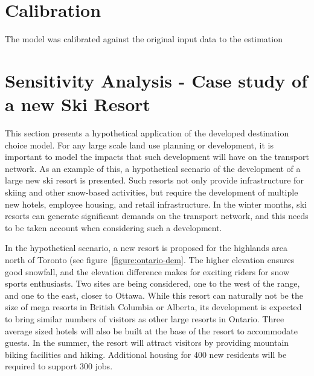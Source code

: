 \section{Calibration}


The model was calibrated against the original input data to the estimation


\section{Sensitivity Analysis - Case study of a new Ski Resort}


This section presents a hypothetical application of the developed destination choice model. For any large scale land use planning or development, it is important to model the impacts that such development will have on the transport network. As an example of this, a hypothetical scenario of the development of a large new ski resort is presented. Such resorts not only provide infrastructure for skiing and other snow-based activities, but require the development of multiple new hotels, employee housing, and retail infrastructure. In the winter months, ski resorts can generate significant demands on the transport network, and this needs to be taken account when considering such a development.

In the hypothetical scenario, a new resort is proposed for the highlands area north of Toronto (see figure~\ref{figure:ontario-dem}. The higher elevation ensures good snowfall, and the elevation difference makes for exciting riders for snow sports enthusiasts. Two sites are being considered, one to the west of the range, and one to the east, closer to Ottawa. While this resort can naturally not be the size of mega resorts in British Columbia or Alberta, its development is expected to bring similar numbers of visitors as other large resorts in Ontario. Three average sized hotels will also be built at the base of the resort to accommodate guests. In the summer, the resort will attract visitors by providing mountain biking facilities and hiking. Additional housing for 400 new residents will be required to support 300 jobs.

